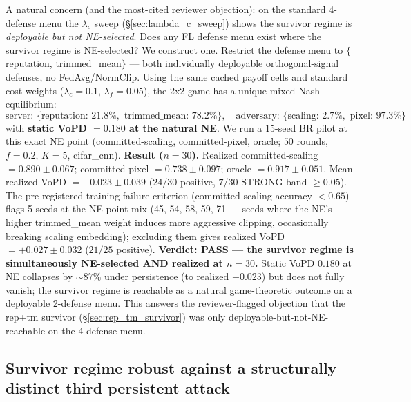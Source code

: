 \documentclass{article}
\begin{document}
A natural concern (and the most-cited reviewer objection): on the standard 4-defense menu the $\lambda_c$ sweep (§\ref{sec:lambda_c_sweep}) shows the survivor regime is \emph{deployable but not NE-selected}. Does any FL defense menu exist where the survivor regime is NE-selected? We construct one. Restrict the defense menu to $\{$reputation, trimmed\_mean$\}$ --- both individually deployable orthogonal-signal defenses, no FedAvg/NormClip. Using the same cached payoff cells and standard cost weights ($\lambda_c = 0.1$, $\lambda_f = 0.05$), the 2x2 game has a unique mixed Nash equilibrium:
\begin{equation*}
\text{server: } \{\text{reputation: } 21.8\%, \text{ trimmed\_mean: } 78.2\%\}, \quad
\text{adversary: } \{\text{scaling: } 2.7\%, \text{ pixel: } 97.3\%\}
\end{equation*}
with \textbf{static VoPD $= 0.180$ at the natural NE}. We run a 15-seed BR pilot at this exact NE point (committed-scaling, committed-pixel, oracle; $50$ rounds, $f{=}0.2$, $K{=}5$, cifar\_cnn). \textbf{Result ($n=30$).} Realized committed-scaling $= 0.890 \pm 0.067$; committed-pixel $= 0.738 \pm 0.097$; oracle $= \mathbf{0.917 \pm 0.051}$. Mean realized VoPD $= \mathbf{+0.023 \pm 0.039}$ ($24/30$ positive, $7/30$ STRONG band $\geq 0.05$). The pre-registered training-failure criterion (committed-scaling accuracy $< 0.65$) flags 5 seeds at the NE-point mix (45, 54, 58, 59, 71 --- seeds where the NE's higher trimmed\_mean weight induces more aggressive clipping, occasionally breaking scaling embedding); excluding them gives realized VoPD $= +0.027 \pm 0.032$ ($21/25$ positive). \textbf{Verdict: PASS --- the survivor regime is simultaneously NE-selected AND realized at $n=30$.} Static VoPD $0.180$ at NE collapses by $\sim 87\%$ under persistence (to realized $+0.023$) but does not fully vanish; the survivor regime is reachable as a natural game-theoretic outcome on a deployable 2-defense menu. This answers the reviewer-flagged objection that the rep+tm survivor (§\ref{sec:rep_tm_survivor}) was only deployable-but-not-NE-reachable on the 4-defense menu.

\subsection{Survivor regime robust against a structurally distinct third persistent attack}
\label{sec:edge_case_survivor}
\end{document}
